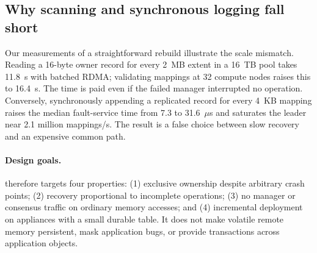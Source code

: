 \subsection{Why scanning and synchronous logging fall short}

Our measurements of a straightforward rebuild illustrate the scale mismatch.
Reading a 16-byte owner record for every 2~MB extent in a 16~TB pool takes
11.8~s with batched RDMA; validating mappings at 32 compute nodes raises this
to 16.4~s. The time is paid even if the failed manager interrupted no operation.
Conversely, synchronously appending a replicated record for every 4~KB mapping
raises the median fault-service time from 7.3 to 31.6~$\mu$s and saturates the
leader near 2.1 million mappings/s. The result is a false choice between slow
recovery and an expensive common path.

\paragraph{Design goals.}
\system therefore targets four properties: (1) exclusive ownership despite
arbitrary crash points; (2) recovery proportional to incomplete operations;
(3) no manager or consensus traffic on ordinary memory accesses; and (4)
incremental deployment on appliances with a small durable table. It does not
make volatile remote memory persistent, mask application bugs, or provide
transactions across application objects.
